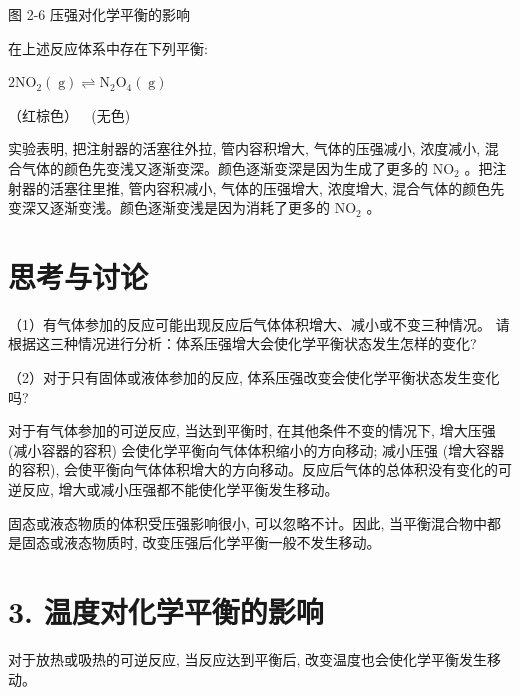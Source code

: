 \documentclass[10pt]{article}
\begin{document}
图 2-6 压强对化学平衡的影响

\begin{center}
\end{center}

在上述反应体系中存在下列平衡:

\(2{\mathrm{{NO}}}_{2}\left( \mathrm{\;g}\right) \rightleftharpoons {\mathrm{N}}_{2}{\mathrm{O}}_{4}\left( \mathrm{\;g}\right)\)

（红棕色） \(\;\) (无色)

实验表明, 把注射器的活塞往外拉, 管内容积增大, 气体的压强减小, 浓度减小, 混合气体的颜色先变浅又逐渐变深。颜色逐渐变深是因为生成了更多的 \({\mathrm{{NO}}}_{2}\) 。把注射器的活塞往里推, 管内容积减小, 气体的压强增大, 浓度增大, 混合气体的颜色先变深又逐渐变浅。颜色逐渐变浅是因为消耗了更多的 \({\mathrm{{NO}}}_{2}\) 。

\section*{思考与讨论}

（1）有气体参加的反应可能出现反应后气体体积增大、减小或不变三种情况。 请根据这三种情况进行分析：体系压强增大会使化学平衡状态发生怎样的变化?

（2）对于只有固体或液体参加的反应, 体系压强改变会使化学平衡状态发生变化吗?

对于有气体参加的可逆反应, 当达到平衡时, 在其他条件不变的情况下, 增大压强 (减小容器的容积) 会使化学平衡向气体体积缩小的方向移动; 减小压强 (增大容器的容积), 会使平衡向气体体积增大的方向移动。反应后气体的总体积没有变化的可逆反应, 增大或减小压强都不能使化学平衡发生移动。

固态或液态物质的体积受压强影响很小, 可以忽略不计。因此, 当平衡混合物中都是固态或液态物质时, 改变压强后化学平衡一般不发生移动。

\section*{3. 温度对化学平衡的影响}

对于放热或吸热的可逆反应, 当反应达到平衡后, 改变温度也会使化学平衡发生移动。
\end{document}
